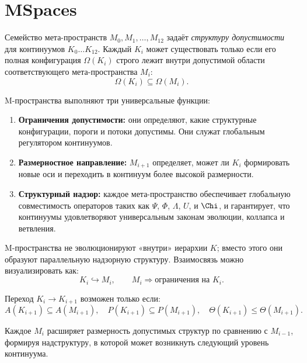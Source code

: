 

\section{MSpaces}
\label{sec:mspaces-overview}

Семейство мета-пространств $M_0, M_1, \dots, M_{12}$ задаёт
\emph{структуру допустимости} для континуумов $K_0\dots K_{12}$.
Каждый $K_i$ может существовать только если его полная конфигурация
$\Omega(K_i)$ строго лежит внутри допустимой области соответствующего
мета-пространства $M_i$:
\[
\Omega(K_i) \subseteq \Omega(M_i).
\]

M-пространства выполняют три универсальные функции:

\begin{enumerate}
    \item \textbf{Ограничения допустимости:}
    они определяют, какие структурные конфигурации, пороги и потоки допустимы.
    Они служат глобальным регулятором континуумов.

    \item \textbf{Размерностное направление:}
    $M_{i+1}$ определяет, может ли $K_i$ формировать новые оси и
    переходить в континуум более высокой размерности.

    \item \textbf{Структурный надзор:}
    каждое мета-пространство обеспечивает глобальную совместимость операторов
    таких как $\Psi$, $\Phi$, $\Lambda$, $U$, и $\Chi$, и гарантирует,
    что континуумы удовлетворяют универсальным законам эволюции, коллапса и
    ветвления.
\end{enumerate}

M-пространства не эволюционируют «внутри» иерархии $K$; вместо
этого они образуют параллельную надзорную структуру.
Взаимосвязь можно визуализировать как:
\[
K_i \hookrightarrow M_i,\qquad
M_i \Rightarrow \text{ограничения на } K_i.
\]

Переход $K_i \to K_{i+1}$ возможен только если:
\[
A(K_{i+1}) \subseteq A(M_{i+1}), \quad
P(K_{i+1}) \subseteq P(M_{i+1}),\quad
\Theta(K_{i+1}) \leq \Theta(M_{i+1}).
\]

Каждое $M_i$ расширяет размерность допустимых структур по сравнению с
$M_{i-1}$, формируя надструктуру, в которой может возникнуть
следующий уровень континуума.
